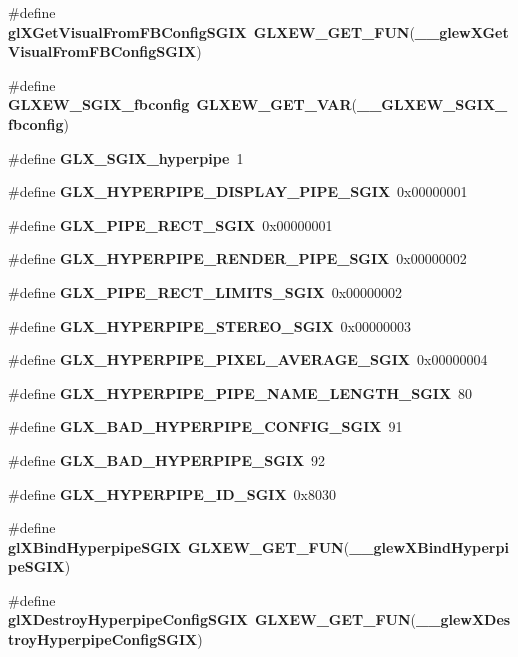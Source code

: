 \begin{DoxyCompactItemize}
\item 
\#define {\bf gl\+X\+Get\+Visual\+From\+F\+B\+Config\+S\+G\+IX}~{\bf G\+L\+X\+E\+W\+\_\+\+G\+E\+T\+\_\+\+F\+UN}({\bf \+\_\+\+\_\+glew\+X\+Get\+Visual\+From\+F\+B\+Config\+S\+G\+IX})
\item 
\#define {\bf G\+L\+X\+E\+W\+\_\+\+S\+G\+I\+X\+\_\+fbconfig}~{\bf G\+L\+X\+E\+W\+\_\+\+G\+E\+T\+\_\+\+V\+AR}({\bf \+\_\+\+\_\+\+G\+L\+X\+E\+W\+\_\+\+S\+G\+I\+X\+\_\+fbconfig})
\item 
\#define {\bf G\+L\+X\+\_\+\+S\+G\+I\+X\+\_\+hyperpipe}~1
\item 
\#define {\bf G\+L\+X\+\_\+\+H\+Y\+P\+E\+R\+P\+I\+P\+E\+\_\+\+D\+I\+S\+P\+L\+A\+Y\+\_\+\+P\+I\+P\+E\+\_\+\+S\+G\+IX}~0x00000001
\item 
\#define {\bf G\+L\+X\+\_\+\+P\+I\+P\+E\+\_\+\+R\+E\+C\+T\+\_\+\+S\+G\+IX}~0x00000001
\item 
\#define {\bf G\+L\+X\+\_\+\+H\+Y\+P\+E\+R\+P\+I\+P\+E\+\_\+\+R\+E\+N\+D\+E\+R\+\_\+\+P\+I\+P\+E\+\_\+\+S\+G\+IX}~0x00000002
\item 
\#define {\bf G\+L\+X\+\_\+\+P\+I\+P\+E\+\_\+\+R\+E\+C\+T\+\_\+\+L\+I\+M\+I\+T\+S\+\_\+\+S\+G\+IX}~0x00000002
\item 
\#define {\bf G\+L\+X\+\_\+\+H\+Y\+P\+E\+R\+P\+I\+P\+E\+\_\+\+S\+T\+E\+R\+E\+O\+\_\+\+S\+G\+IX}~0x00000003
\item 
\#define {\bf G\+L\+X\+\_\+\+H\+Y\+P\+E\+R\+P\+I\+P\+E\+\_\+\+P\+I\+X\+E\+L\+\_\+\+A\+V\+E\+R\+A\+G\+E\+\_\+\+S\+G\+IX}~0x00000004
\item 
\#define {\bf G\+L\+X\+\_\+\+H\+Y\+P\+E\+R\+P\+I\+P\+E\+\_\+\+P\+I\+P\+E\+\_\+\+N\+A\+M\+E\+\_\+\+L\+E\+N\+G\+T\+H\+\_\+\+S\+G\+IX}~80
\item 
\#define {\bf G\+L\+X\+\_\+\+B\+A\+D\+\_\+\+H\+Y\+P\+E\+R\+P\+I\+P\+E\+\_\+\+C\+O\+N\+F\+I\+G\+\_\+\+S\+G\+IX}~91
\item 
\#define {\bf G\+L\+X\+\_\+\+B\+A\+D\+\_\+\+H\+Y\+P\+E\+R\+P\+I\+P\+E\+\_\+\+S\+G\+IX}~92
\item 
\#define {\bf G\+L\+X\+\_\+\+H\+Y\+P\+E\+R\+P\+I\+P\+E\+\_\+\+I\+D\+\_\+\+S\+G\+IX}~0x8030
\item 
\#define {\bf gl\+X\+Bind\+Hyperpipe\+S\+G\+IX}~{\bf G\+L\+X\+E\+W\+\_\+\+G\+E\+T\+\_\+\+F\+UN}({\bf \+\_\+\+\_\+glew\+X\+Bind\+Hyperpipe\+S\+G\+IX})
\item 
\#define {\bf gl\+X\+Destroy\+Hyperpipe\+Config\+S\+G\+IX}~{\bf G\+L\+X\+E\+W\+\_\+\+G\+E\+T\+\_\+\+F\+UN}({\bf \+\_\+\+\_\+glew\+X\+Destroy\+Hyperpipe\+Config\+S\+G\+IX})
\item 

\end{DoxyCompactItemize}
